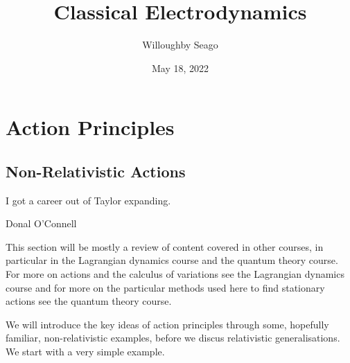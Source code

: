 \documentclass[fleqn]{NotesClass}
\title{Classical Electrodynamics}
\author{Willoughby Seago}
\date{May 18, 2022}
\begin{document}
    \frontmatter
    \titlepage
    \innertitlepage{}
    \tableofcontents
    \listoffigures
    \mainmatter
    
    
    
    
    \part{Action Principles}
    \chapter{Non-Relativistic Actions}
    \epigraph{I got a career out of Taylor expanding.}{Donal O'Connell}
    
    This section will be mostly a review of content covered in other courses, in particular in the Lagrangian dynamics course and the quantum theory course.
    For more on actions and the calculus of variations see the Lagrangian dynamics course and for more on the particular methods used here to find stationary actions see the quantum theory course.
    
    We will introduce the key ideas of action principles through some, hopefully familiar, non-relativistic examples, before we discus relativistic generalisations.
    We start with a very simple example.
    
\end{document}
